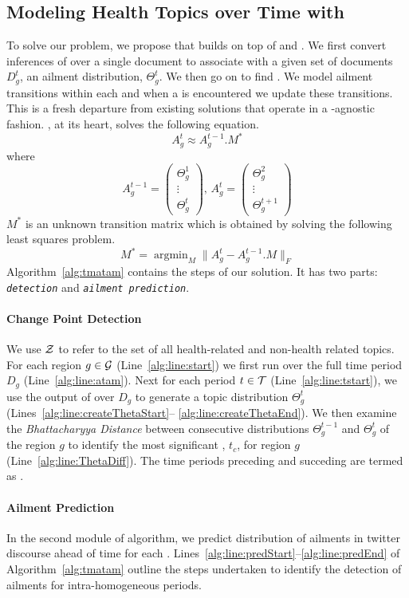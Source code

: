 \subsection{Modeling Health Topics over Time with \tmatam}
\label{subsec:model}
To solve our problem, we propose \tmatam that builds on top of \atam and \tmlda.
We first convert inferences of \atam over a single document to associate with a given set of documents $D_g^t$, an ailment
distribution, $\Theta_g^t$. We then go on to find \seasons. We model ailment transitions within each \season and when a \change is 
encountered we update these transitions.  This is a fresh departure
from existing solutions that operate in a \season-agnostic fashion\cite{DBLP:conf/kdd/WangAB12}.
\tmatam, at its heart, solves the following equation.
\begin{equation}
A_g^{t}\approx A_g^{t-1}.M^*
\end{equation}
where
\begin{equation}
A_g^{t-1}=\begin{pmatrix}\Theta_g^1\\\vdots\\\Theta_g^t\end{pmatrix},\,A_g^t=\begin{pmatrix}\Theta_g^2\\\vdots\\\Theta_g^{t+1}\end{pmatrix}
\end{equation}
$M^*$ is an unknown transition matrix which is obtained by solving the following least squares problem.
\[
M^*=\mathop{argmin}_M\|A_g^t- A_g^{t-1}.M\|_F
\]
Algorithm~\ref{alg:tmatam} contains the steps of our solution. It has 
two parts:  \change \emph{\texttt{detection}} and \emph{\texttt{ailment prediction}}. 
\paragraph{Change Point Detection}
We use $\mathcal{Z}$ to refer to the set of all health-related and
non-health related topics. For each region $g \in \mathcal{G}$
(Line~\ref{alg:line:start}) we first run \atam over the full time
period $D_g$ (Line~\ref{alg:line:atam}).  Next for each period $t\in
\mathcal{T}$ (Line~\ref{alg:line:tstart}), we use the output of \atam over
$D_g$ to generate a topic distribution $\Theta_g^t$
(Lines~\ref{alg:line:createThetaStart}--
\ref{alg:line:createThetaEnd}).  We then examine the
\emph{Bhattacharyya Distance} between consecutive distributions
$\Theta_g^{t-1}$ and $\Theta_g^t$ of the region $g$ to identify the
most significant \change, $t_c$, for region $g$ (Line~\ref{alg:line:ThetaDiff}). The
time periods preceding and succeding \change are termed as \seasons.
\paragraph{Ailment Prediction}
In the second module of \tmatam algorithm, we predict distribution of ailments in twitter discourse ahead of time for each \season.
Lines~\ref{alg:line:predStart}--\ref{alg:line:predEnd} 
of Algorithm~\ref{alg:tmatam} outline the steps undertaken to identify the detection of ailments for intra-homogeneous periods.
